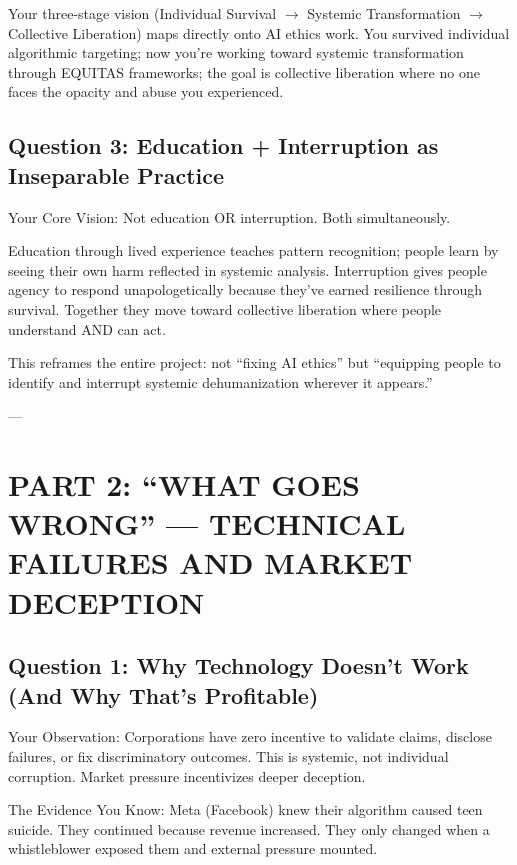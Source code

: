 \documentclass[12pt,letterpaper]{article}
\begin{document}
\begin{puzzleplan}
Your three-stage vision (Individual Survival $\rightarrow$ Systemic Transformation $\rightarrow$ Collective Liberation) maps directly onto AI ethics work. You survived individual algorithmic targeting; now you're working toward systemic transformation through EQUITAS frameworks; the goal is collective liberation where no one faces the opacity and abuse you experienced.
\end{puzzleplan}

\subsection{Question 3: Education + Interruption as Inseparable Practice}

Your Core Vision: Not education OR interruption. Both simultaneously.

Education through lived experience teaches pattern recognition; people learn by seeing their own harm reflected in systemic analysis. Interruption gives people agency to respond unapologetically because they've earned resilience through survival. Together they move toward collective liberation where people understand AND can act.

This reframes the entire project: not ``fixing AI ethics'' but ``equipping people to identify and interrupt systemic dehumanization wherever it appears.''

---

\section{PART 2: ``WHAT GOES WRONG'' --- TECHNICAL FAILURES AND MARKET DECEPTION}

\subsection{Question 1: Why Technology Doesn't Work (And Why That's Profitable)}

\begin{livedexperience}
Your Observation: Corporations have zero incentive to validate claims, disclose failures, or fix discriminatory outcomes. This is systemic, not individual corruption. Market pressure incentivizes deeper deception.

The Evidence You Know: Meta (Facebook) knew their algorithm caused teen suicide. They continued because revenue increased. They only changed when a whistleblower exposed them and external pressure mounted.
\end{livedexperience}
\end{document}
